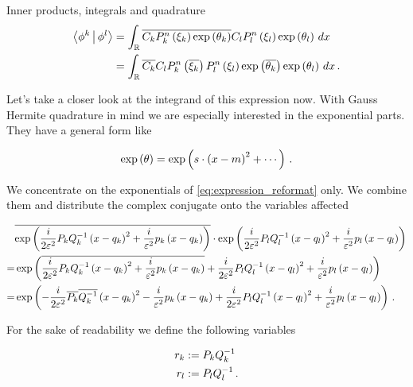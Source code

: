 \begin{chapter}{Inner products, integrals and quadrature}
\begin{equation} \label{eq:expression_reformat}
\begin{split}
  \Braket{\phi^k | \phi^l} & =
  \int_\mathbb{R} \overline{C_k P^n_k\left( \xi_k \right) \exp \left( \theta_k \right)} C_l P^n_l\left( \xi_l \right) \exp \left( \theta_l \right) \,dx \\
  & =   \int_\mathbb{R} \overline{C_k} C_l P^n_k\left( \overline{\xi_k} \right) P^n_l\left( \xi_l \right) \exp \left( \overline{\theta_k} \right) \exp \left( \theta_l \right) \,dx \,.
\end{split}
\end{equation}

Let's take a closer look at the integrand of this expression now. With Gauss Hermite
quadrature in mind we are especially interested in the exponential parts. They have
a general form like

\begin{equation} \label{eq:expression_format_exponential}
  \exp\left( \theta \right) = \exp\left(s \cdot \left(x-m\right)^2 + \cdots \right) \,.
\end{equation}

We concentrate on the exponentials of \eqref{eq:expression_reformat} only. We combine
them and distribute the complex conjugate onto the variables affected

\begin{equation*}
\begin{split}
    & \overline{\exp\left(\frac{i}{2\varepsilon^2} P_k Q_k^{-1} \left(x-q_k\right)^2 + \frac{i}{\varepsilon^2} p_k \left( x-q_k \right)\right)}
      \cdot \exp\left(\frac{i}{2\varepsilon^2} P_l Q_l^{-1} \left(x-q_l\right)^2 + \frac{i}{\varepsilon^2} p_l \left( x-q_l \right)\right) \\
  = & \exp\left(\overline{\frac{i}{2\varepsilon^2} P_k Q_k^{-1} \left(x-q_k\right)^2 + \frac{i}{\varepsilon^2} p_k \left( x-q_k \right)}
              + \frac{i}{2\varepsilon^2} P_l Q_l^{-1} \left(x-q_l\right)^2 + \frac{i}{\varepsilon^2} p_l \left( x-q_l \right) \right) \\
  = & \exp\left( -\frac{i}{2\varepsilon^2} \overline{P_k} \overline{Q_k^{-1}} \left(x-q_k\right)^2 - \frac{i}{\varepsilon^2} p_k \left( x-q_k \right)
              + \frac{i}{2\varepsilon^2} P_l Q_l^{-1} \left(x-q_l\right)^2 + \frac{i}{\varepsilon^2} p_l \left( x-q_l \right) \right) \,.
\end{split}
\end{equation*}

For the sake of readability we define the following variables

\begin{equation}
\begin{split}
  r_k & := P_k Q_k^{-1} \\
  r_l & := P_l Q_l^{-1} \,.
\end{split}
\end{equation}


\end{chapter}
